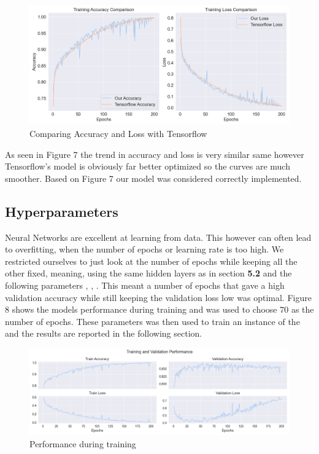 \begin{figure}[H]
    \centering
    \includegraphics[scale=0.45]{figures_for_report/tensorflow_vs_our}
    \captionsetup{justification=centering,margin=2cm}
    \caption{Comparing Accuracy and Loss with Tensorflow}
\end{figure}

As seen in Figure 7 the trend in accuracy and loss is very similar same however Tensorflow's model is obviously far better optimized so the curves are much smoother.
Based on Figure 7 our model was considered correctly implemented.

\subsection{Hyperparameters}
Neural Networks are excellent at learning from data.
This however can often lead to overfitting, when the number of epochs or learning rate is too high.
We restricted ourselves to just look at the number of epochs while keeping all the other fixed, meaning, using the same hidden layers as in section \textbf{5.2} and the following parameters
, , .
This meant a number of epochs that gave a high validation accuracy while still keeping the validation loss low was optimal.
Figure 8 shows the models performance during training and was used to choose $70$ as the number of epochs.
These parameters was then used to train an instance of the  and the results are reported in the following section.
\begin{figure}[H]
    \centering
    \includegraphics[scale=0.45]{figures_for_report/train_validation_nn_performance}
    \captionsetup{justification=centering,margin=2cm}
    \caption{Performance during training}
\end{figure}


